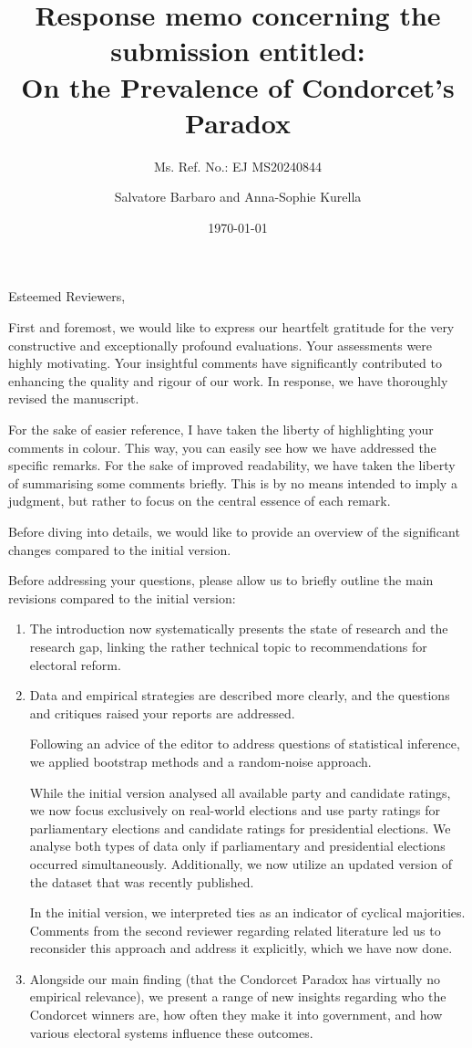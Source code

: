 \documentclass[a4paper, 12pt]{scrartcl}
\title{{\small Response memo concerning the submission entitled:} \\ On the Prevalence of Condorcet's Paradox }
\subtitle{Ms. Ref. No.: EJ MS20240844}
\author{Salvatore Barbaro and Anna-Sophie Kurella}
\date{\today}
\theoremstyle{break}
\begin{document}
\maketitle

\linenumbers

\noindent Esteemed Reviewers,


First and foremost, we would like to express our heartfelt gratitude for the very constructive and exceptionally profound evaluations. Your assessments were highly motivating. Your insightful comments have significantly contributed to enhancing the quality and rigour of our work. In response, we have thoroughly revised the manuscript.

For the sake of easier reference, I have taken the liberty of highlighting your comments in colour. This way, you can easily see how we have addressed the specific remarks. For the sake of improved readability, we have taken the liberty of summarising some comments briefly. This is by no means intended to imply a judgment, but rather to focus on the central essence of each remark.

Before diving into details, we would like to provide an overview of the significant changes compared to the initial version.

Before addressing your questions, please allow us to briefly outline the main revisions compared to the initial version:
\begin{enumerate}
\item The introduction now systematically presents the state of research and the research gap, linking the rather technical topic to recommendations for electoral reform.
\item Data and empirical strategies are described more clearly, and the questions and critiques raised your reports are addressed.
	
Following an advice of the editor to address questions of statistical inference, we applied bootstrap methods and a random-noise approach.
	
While the initial version analysed all available party and candidate ratings, we now focus exclusively on real-world elections and use party ratings for parliamentary elections and candidate ratings for presidential elections. We analyse both types of data only if parliamentary and presidential elections occurred simultaneously. Additionally, we now utilize an updated version of the dataset that was recently published. 
	
	
In the initial version, we interpreted ties as an indicator of cyclical majorities. Comments from the second reviewer regarding related literature led us to reconsider this approach and address it explicitly, which we have now done.
%
\item Alongside our main finding (that the Condorcet Paradox has virtually no empirical relevance), we present a range of new insights regarding who the Condorcet winners are, how often they make it into government, and how various electoral systems influence these outcomes.
\end{enumerate}
\end{document}
